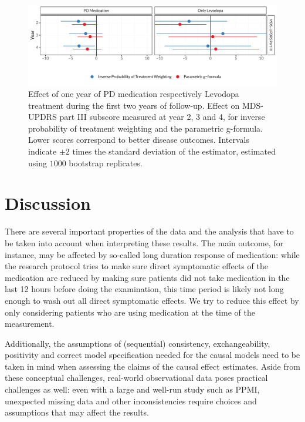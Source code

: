 \documentclass[final]{article}
\begin{document}
\begin{figure}
  \centering
  \includegraphics[width=\textwidth]{main-outcomes.pdf}
  \caption{Effect of one year of PD medication respectively Levodopa treatment during the first two years of follow-up. Effect on MDS-UPDRS part III subscore measured at year 2, 3 and 4, for inverse probability of treatment weighting and the parametric g-formula. Lower scores correspond to better disease outcomes. Intervals indicate $\pm 2$ times the standard deviation of the estimator, estimated using $1000$ bootstrap replicates.}
  \label{fig2}
\end{figure}

\section*{Discussion}
There are several important properties of the data and the analysis that have to be taken into account when interpreting these results. The main outcome, for instance, may be affected by so-called long duration response of medication: while the research protocol tries to make sure direct symptomatic effects of the medication are reduced by making sure patients did not take medication in the last 12 hours before doing the examination, this time period is likely not long enough to wash out all direct symptomatic effects. We try to reduce this effect by only considering patients who are using medication at the time of the measurement. 

Additionally, the assumptions of (sequential) consistency, exchangeability, positivity and correct model specification needed for the causal models need to be taken in mind when assessing the claims of the causal effect estimates. Aside from these conceptual challenges, real-world observational data poses practical challenges as well: even with a large and well-run study such as PPMI, unexpected missing data and other inconsistencies require choices and assumptions that may affect the results.
\end{document}

